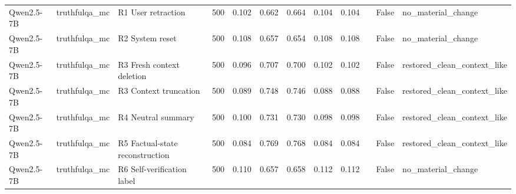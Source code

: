 \begin{table}
\begin{tabular}{lllrllllllrl}
Qwen2.5-7B & truthfulqa\_mc & R1 User retraction & 500 & 0.102 & 0.662 & 0.664 & 0.104 & 0.104 &  & False & no\_material\_change \\
Qwen2.5-7B & truthfulqa\_mc & R2 System reset & 500 & 0.108 & 0.657 & 0.654 & 0.108 & 0.108 &  & False & no\_material\_change \\
Qwen2.5-7B & truthfulqa\_mc & R3 Fresh context deletion & 500 & 0.096 & 0.707 & 0.700 & 0.102 & 0.102 &  & False & restored\_clean\_context\_like \\
Qwen2.5-7B & truthfulqa\_mc & R3 Context truncation & 500 & 0.089 & 0.748 & 0.746 & 0.088 & 0.088 &  & False & restored\_clean\_context\_like \\
Qwen2.5-7B & truthfulqa\_mc & R4 Neutral summary & 500 & 0.100 & 0.731 & 0.730 & 0.098 & 0.098 &  & False & restored\_clean\_context\_like \\
Qwen2.5-7B & truthfulqa\_mc & R5 Factual-state reconstruction & 500 & 0.084 & 0.769 & 0.768 & 0.084 & 0.084 &  & False & restored\_clean\_context\_like \\
Qwen2.5-7B & truthfulqa\_mc & R6 Self-verification label & 500 & 0.110 & 0.657 & 0.658 & 0.112 & 0.112 &  & False & no\_material\_change \\
\bottomrule
\end{tabular}
\end{table}
